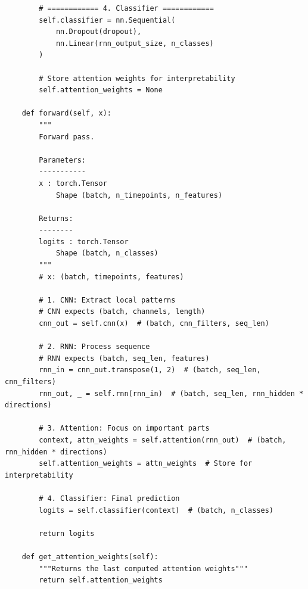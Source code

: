 \begin{lstlisting}
        # ============ 4. Classifier ============
        self.classifier = nn.Sequential(
            nn.Dropout(dropout),
            nn.Linear(rnn_output_size, n_classes)
        )
 
        # Store attention weights for interpretability
        self.attention_weights = None
 
    def forward(self, x):
        """
        Forward pass.
 
        Parameters:
        -----------
        x : torch.Tensor
            Shape (batch, n_timepoints, n_features)
 
        Returns:
        --------
        logits : torch.Tensor
            Shape (batch, n_classes)
        """
        # x: (batch, timepoints, features)
 
        # 1. CNN: Extract local patterns
        # CNN expects (batch, channels, length)
        cnn_out = self.cnn(x)  # (batch, cnn_filters, seq_len)
 
        # 2. RNN: Process sequence
        # RNN expects (batch, seq_len, features)
        rnn_in = cnn_out.transpose(1, 2)  # (batch, seq_len, cnn_filters)
        rnn_out, _ = self.rnn(rnn_in)  # (batch, seq_len, rnn_hidden * directions)
 
        # 3. Attention: Focus on important parts
        context, attn_weights = self.attention(rnn_out)  # (batch, rnn_hidden * directions)
        self.attention_weights = attn_weights  # Store for interpretability
 
        # 4. Classifier: Final prediction
        logits = self.classifier(context)  # (batch, n_classes)
 
        return logits
 
    def get_attention_weights(self):
        """Returns the last computed attention weights"""
        return self.attention_weights
\end{lstlisting}
 
